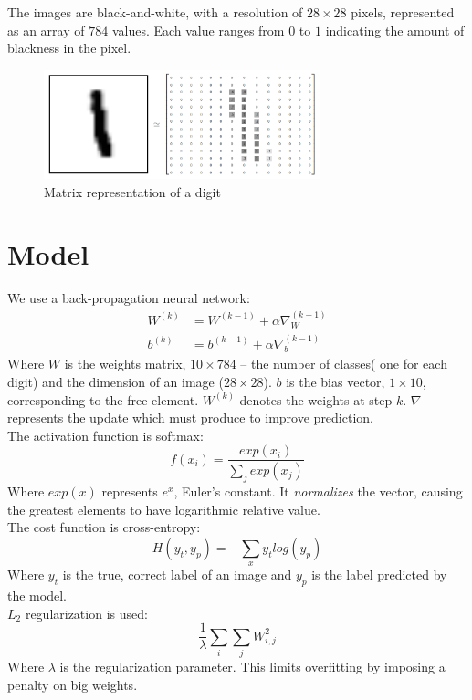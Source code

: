 \documentclass[a4paper]{article}
\begin{document}
The images are black-and-white, with a resolution of $28 \times 28$ pixels, represented as an array of $784$ values. Each value ranges from $0$ to $1$ indicating the amount of blackness in the pixel.

\begin{figure}[htb]
\centering
\includegraphics[width=8cm]{images/mnist-matrix.png}
\caption{Matrix representation of a digit \cite{tf}}
\end{figure}


\newpage
\section{Model}
\label{sec:model}
We use a back-propagation neural network:
\begin{align*}
W^{(k)} &= W^{(k-1)} + \alpha \nabla_W^{(k-1)} \\ 
b^{(k)} &= b^{(k-1)} + \alpha \nabla_b^{(k-1)}
\end{align*}
Where $W$ is the weights matrix, $10 \times 784$ -- the number of classes( one for each digit) and the dimension of an image ($28 \times 28$). $b$ is the bias vector, $1 \times 10$, corresponding to the free element. $W^{(k)}$ denotes the weights at step $k$. $\nabla$ represents the update which must produce to improve prediction.
\\

The activation function is softmax:
$$f(x_i)=\frac{exp(x_i)}{\sum_j exp(x_j)}$$
Where $exp(x)$ represents $e^x$, Euler's constant. It \textit{normalizes} the vector, causing the greatest elements to have logarithmic relative value.
\\

The cost function is cross-entropy:
$$H(y_t, y_p)=-\sum_x y_t log(y_p)$$
Where $y_t$ is the true, correct label of an image and $y_p$ is the label predicted by the model.
\\

$L_2$ regularization is used:
$$\frac{1}{\lambda} \sum_i \sum_j W_{i,j}^2$$
Where $\lambda$ is the regularization parameter. This limits overfitting by imposing a penalty on big weights.
\\
\end{document}
